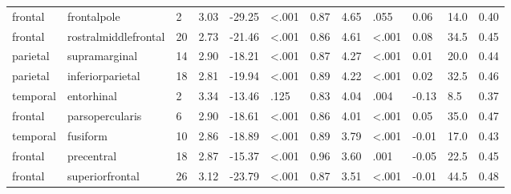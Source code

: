 \documentclass{article}
\begin{document}
\begin{longtable}{llR{1.5cm}R{1cm}R{1.3cm}R{1cm}R{1cm}R{1.3cm}R{1cm}R{1.8cm}R{1.3cm}R{1.8cm}}
   frontal &               frontalpole &            2 &                  3.03 &           -29.25 &      \textless.001 &                               0.87 &                          4.65 &                            .055 &  0.06 &   14.0 &      0.40 \\
   frontal &      rostralmiddlefrontal &           20 &                  2.73 &           -21.46 &      \textless.001 &                               0.86 &                          4.61 &                   \textless.001 &  0.08 &   34.5 &      0.45 \\
  parietal &             supramarginal &           14 &                  2.90 &           -18.21 &      \textless.001 &                               0.87 &                          4.27 &                   \textless.001 &  0.01 &   20.0 &      0.44 \\
  parietal &          inferiorparietal &           18 &                  2.81 &           -19.94 &      \textless.001 &                               0.89 &                          4.22 &                   \textless.001 &  0.02 &   32.5 &      0.46 \\
  temporal &                entorhinal &            2 &                  3.34 &           -13.46 &               .125 &                               0.83 &                          4.04 &                            .004 & -0.13 &    8.5 &      0.37 \\
   frontal &           parsopercularis &            6 &                  2.90 &           -18.61 &      \textless.001 &                               0.86 &                          4.01 &                   \textless.001 &  0.05 &   35.0 &      0.47 \\
  temporal &                  fusiform &           10 &                  2.86 &           -18.89 &      \textless.001 &                               0.89 &                          3.79 &                   \textless.001 & -0.01 &   17.0 &      0.43 \\
   frontal &                precentral &           18 &                  2.87 &           -15.37 &      \textless.001 &                               0.96 &                          3.60 &                            .001 & -0.05 &   22.5 &      0.45 \\
   frontal &           superiorfrontal &           26 &                  3.12 &           -23.79 &      \textless.001 &                               0.87 &                          3.51 &                   \textless.001 & -0.01 &   44.5 &      0.48 \\

\end{longtable}
\end{document}
